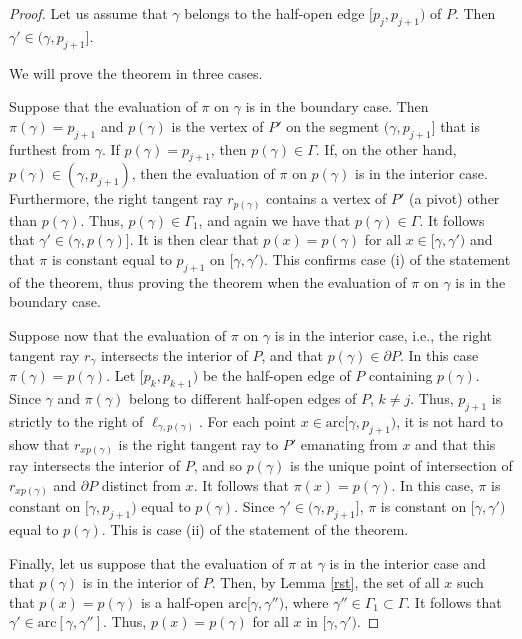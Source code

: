 \documentclass[11pt]{amsart}
\theoremstyle{remark}
\numberwithin{equation}{section}
\newcommand{\arc}{\mathrm{arc}}
\begin{document}
\begin{proof}
 Let us assume that $\gamma$ belongs to the half-open edge $[p_j,p_{j+1})$ of $P$.  
Then  $\gamma'\in (\gamma,p_{j+1}]$. 

We will prove the theorem in three cases.

Suppose that the evaluation of $\pi$ on $\gamma$ is in the boundary case. Then  $\pi(\gamma)=p_{j+1}$ and  $p(\gamma)$ is the vertex of $P'$ on the segment $(\gamma,p_{j+1}]$ that is furthest from $\gamma$. If $p(\gamma)=p_{j+1}$, then $p(\gamma)\in \Gamma$. If, on the other hand, $p(\gamma)\in (\gamma,p_{j+1})$, then the evaluation of $\pi$ on $p(\gamma)$ is in the interior case. Furthermore, the right tangent ray $r_{p(\gamma)}$ contains a vertex of $P'$ (a pivot) other than $p(\gamma)$. Thus, $p(\gamma)\in \Gamma_1$, and again we have that $p(\gamma)\in \Gamma$. It follows that $\gamma'\in (\gamma,p(\gamma)]$. It is then clear that $p(x)=p(\gamma)$ for all $x\in [\gamma,\gamma')$ and that $\pi$ is constant equal to $p_{j+1}$ on $[\gamma,\gamma')$.  This confirms case (i) of the statement of the theorem, thus proving the theorem when the evaluation of $\pi$ on $\gamma$ is in the boundary case.


Suppose now that the evaluation of $\pi$ on $\gamma$ is in the interior case, i.e., the right tangent ray $r_{\gamma}$ intersects the interior of $P$, and that $p(\gamma)\in \partial P$. In this case $\pi(\gamma)=p(\gamma)$.  Let $[p_k,p_{k+1})$ be the half-open edge of $P$ containing $p(\gamma)$. Since $\gamma$ and $\pi(\gamma)$  belong to different half-open edges of $P$, $k\neq j$. 
Thus, $p_{j+1}$ is strictly to the right of $\ell_{\gamma,p(\gamma)}$. 
For each point $x\in \arc[\gamma,p_{j+1})$, it is not hard to show that  $r_{xp(\gamma)}$ is the right tangent ray to $P'$ emanating from $x$ and that this ray intersects the interior of $P$, and so  $p(\gamma)$ is the unique point of intersection 
of $r_{xp(\gamma)}$ and $\partial P$ distinct from $x$. It follows that $\pi(x)=p(\gamma)$.
In this case, $\pi$ is constant on $[\gamma,p_{j+1})$ equal to $p(\gamma)$. Since $\gamma'\in (\gamma,p_{j+1}]$, $\pi$ is constant on $[\gamma,\gamma')$ equal to $p(\gamma)$.  This is case (ii) of the statement of the theorem.



Finally, let us suppose that the evaluation of $\pi$ at $\gamma$ is in the interior case and that $p(\gamma)$ is in the interior of $P$. 
Then, by Lemma \ref{rst}, the set of all $x$ such that $p(x)=p(\gamma)$ is a half-open $\arc[\gamma,\gamma'')$, where $\gamma''\in \Gamma_1\subset \Gamma$. It follows that $\gamma'\in \arc[\gamma,\gamma'']$. Thus, $p(x)=p(\gamma)$ for all $x$ in $[\gamma,\gamma')$.


\end{proof}
\end{document}
